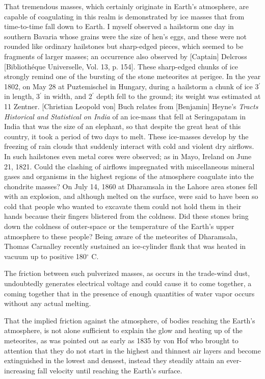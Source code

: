 \documentclass[a4paper, 12pt, oneside]{article}
\begin{document}
That tremendous masses, which certainly originate in Earth's atmosphere, are capable of coagulating in this realm is demonstrated by ice masses that from time-to-time fall down to Earth. I myself observed a hailstorm one day in southern Bavaria whose grains were the size of hen's eggs, and these were not rounded like ordinary hailstones but sharp-edged pieces, which seemed to be fragments of larger masses; an occurrence also observed by [Captain] Delcross [Bibliothéque Universelle, Vol. 13, p. 154]. These sharp-edged chunks of ice strongly remind one of the bursting of the stone meteorites at perigee. In the year 1802, on May 28 at Puztemischel in Hungary, during a hailstorm a chunk of ice 3$^{\prime}$ in length, 3$^{\prime}$ in width, and 2$^{\prime}$ depth fell to the ground; its weight was estimated at 11 Zentner. [Christian Leopold von] Buch relates from [Benjamin] Heyne's \emph{Tracts Historical and Statistical on India} of an ice-mass that fell at Seringapatam in India that was the size of an elephant, so that despite the great heat of this country, it took a period of two days to melt. These ice-masses develop by the freezing of rain clouds that suddenly interact with cold and violent dry airflows. In such hailstones even metal cores were observed; as in Mayo, Ireland on June 21, 1821. Could the clashing of airflows impregnated with miscellaneous mineral gases and organisms in the highest regions of the atmosphere coagulate into the chondrite masses? On July 14, 1860 at Dharamsala in the Lahore area stones fell with an explosion, and although melted on the surface, were said to have been so cold that people who wanted to excavate them could not hold them in their hands because their fingers blistered from the coldness. Did these stones bring down the coldness of outer-space or the temperature of the Earth's upper atmosphere to these people? Being aware of the meteorites of Dharamsala, Thomas Carnalley recently sustained an ice-cylinder flank that was heated in vacuum up to positive 180$^{\circ}$ C.

The friction between such pulverized masses, as occurs in the trade-wind dust, undoubtedly generates electrical voltage and could cause it to come together, a coming together that in the presence of enough quantities of water vapor occurs without any actual melting.

That the implied friction against the atmosphere, of bodies reaching the Earth's atmosphere, is not alone sufficient to explain the glow and heating up of the meteorites, as was pointed out as early as 1835 by von Hof who brought to attention that they do not start in the highest and thinnest air layers and become extinguished in the lowest and densest, instead they steadily attain an ever-increasing fall velocity until reaching the Earth's surface.
\end{document}
